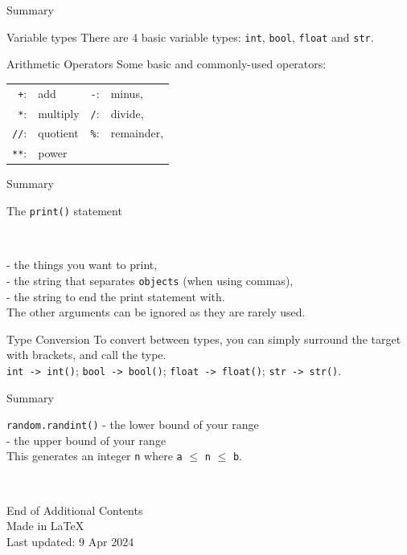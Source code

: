 \documentclass[dvipsnames, svgnames, x11names, handout]{beamer}
\begin{document}
\begin{frame}[fragile]{Summary}
\begin{block}{Variable types}
There are 4 basic variable types: \texttt{int}, \texttt{bool}, \texttt{float} and \texttt{str}.
\end{block}
\begin{block}{Arithmetic Operators}
Some basic and commonly-used operators:\\
\centering
\begin{tabular}{rlrl}
\texttt{+}:& add & \texttt{-}:& minus,\\
\texttt{*}:& multiply & \texttt{/}:& divide,\\
\texttt{//}:& quotient & \texttt{\%}:& remainder,\\
\texttt{**}:& power &&
\end{tabular}
\end{block}
\end{frame}

\begin{frame}[fragile]{Summary}
\begin{block}{The \texttt{print()} statement}

\

 - the things you want to print,\\
 - the string that separates \texttt{objects} (when using commas),\\
 - the string to end the print statement with.\\
The other arguments can be ignored as they are rarely used.
\end{block}
\begin{block}{Type Conversion}
To convert between types, you can simply surround the target with brackets, and call the type.\\
\texttt{int -> int()}; \texttt{bool -> bool()}; \texttt{float -> float()}; \texttt{str -> str()}.
\end{block}
\end{frame}

\begin{frame}[fragile]{Summary}
\begin{block}{\texttt{random.randint()}}
 - the lower bound of your range\\[1pt]
 - the upper bound of your range\\
This generates an integer \texttt{n} where \texttt{a} $\leq$ \texttt{n} $\leq$ \texttt{b}.
\end{block}
\end{frame}

\begin{frame}{ \ }
	\begin{center}
		End of Additional Contents\\
		Made in \LaTeX\\
		Last updated: 9 Apr 2024
	\end{center}
\end{frame}
\end{document}
